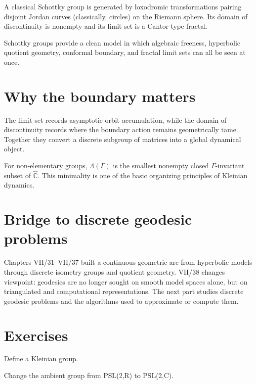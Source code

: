 A classical Schottky group is generated by loxodromic transformations pairing disjoint Jordan curves (classically, circles) on the Riemann sphere.  Its domain of discontinuity is nonempty and its limit set is a Cantor-type fractal.

\begin{remark}
Schottky groups provide a clean model in which algebraic freeness, hyperbolic quotient geometry, conformal boundary, and fractal limit sets can all be seen at once.
\end{remark}


\section{Why the boundary matters}

The limit set records asymptotic orbit accumulation, while the domain of discontinuity records where the boundary action remains geometrically tame.  Together they convert a discrete subgroup of matrices into a global dynamical object.

For non-elementary groups, \(\Lambda(\Gamma)\) is the smallest nonempty closed \(\Gamma\)-invariant subset of \(\widehat{\mathbb C}\).  This minimality is one of the basic organizing principles of Kleinian dynamics.


\section{Bridge to discrete geodesic problems}

Chapters VII/31--VII/37 built a continuous geometric arc from hyperbolic models through discrete isometry groups and quotient geometry.  VII/38 changes viewpoint: geodesics are no longer sought on smooth model spaces alone, but on triangulated and computational representations.  The next part studies discrete geodesic problems and the algorithms used to approximate or compute them.

\section{Exercises}

\begin{exercise}\label{exr:vii37-01}
Define a Kleinian group.
\end{exercise}

\begin{hint}
Change the ambient group from PSL(2,R) to PSL(2,C).
\end{hint}

